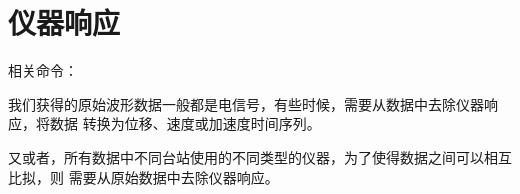 \section{仪器响应}
相关命令：

我们获得的原始波形数据一般都是电信号，有些时候，需要从数据中去除仪器响应，将数据
转换为位移、速度或加速度时间序列。

又或者，所有数据中不同台站使用的不同类型的仪器，为了使得数据之间可以相互比拟，则
需要从原始数据中去除仪器响应。

